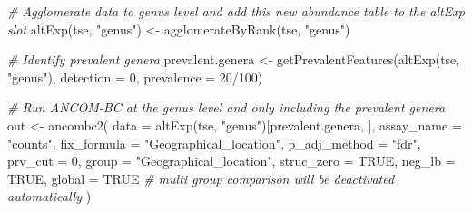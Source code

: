 \documentclass[
]{book}
\newenvironment{Shaded}{\begin{snugshade}}{\end{snugshade}}
\newcommand{\AttributeTok}[1]{\textcolor[rgb]{0.77,0.63,0.00}{#1}}
\newcommand{\CommentTok}[1]{\textcolor[rgb]{0.56,0.35,0.01}{\textit{#1}}}
\newcommand{\ConstantTok}[1]{\textcolor[rgb]{0.00,0.00,0.00}{#1}}
\newcommand{\DecValTok}[1]{\textcolor[rgb]{0.00,0.00,0.81}{#1}}
\newcommand{\FunctionTok}[1]{\textcolor[rgb]{0.00,0.00,0.00}{#1}}
\newcommand{\NormalTok}[1]{#1}
\newcommand{\OtherTok}[1]{\textcolor[rgb]{0.56,0.35,0.01}{#1}}
\newcommand{\SpecialCharTok}[1]{\textcolor[rgb]{0.00,0.00,0.00}{#1}}
\newcommand{\StringTok}[1]{\textcolor[rgb]{0.31,0.60,0.02}{#1}}
\begin{document}
\begin{Shaded}
\begin{Highlighting}[]
\CommentTok{\# Agglomerate data to genus level and add this new abundance table to the altExp slot}
\FunctionTok{altExp}\NormalTok{(tse, }\StringTok{"genus"}\NormalTok{) }\OtherTok{\textless{}{-}} \FunctionTok{agglomerateByRank}\NormalTok{(tse, }\StringTok{"genus"}\NormalTok{)}

\CommentTok{\# Identify prevalent genera}
\NormalTok{prevalent.genera }\OtherTok{\textless{}{-}} \FunctionTok{getPrevalentFeatures}\NormalTok{(}\FunctionTok{altExp}\NormalTok{(tse, }\StringTok{"genus"}\NormalTok{), }\AttributeTok{detection =} \DecValTok{0}\NormalTok{, }\AttributeTok{prevalence =} \DecValTok{20}\SpecialCharTok{/}\DecValTok{100}\NormalTok{)}

\CommentTok{\# Run ANCOM{-}BC at the genus level and only including the prevalent genera}
\NormalTok{out }\OtherTok{\textless{}{-}} \FunctionTok{ancombc2}\NormalTok{(}
  \AttributeTok{data =} \FunctionTok{altExp}\NormalTok{(tse, }\StringTok{"genus"}\NormalTok{)[prevalent.genera, ],}
  \AttributeTok{assay\_name =} \StringTok{"counts"}\NormalTok{, }
  \AttributeTok{fix\_formula =} \StringTok{"Geographical\_location"}\NormalTok{, }
  \AttributeTok{p\_adj\_method =} \StringTok{"fdr"}\NormalTok{, }
  \AttributeTok{prv\_cut =} \DecValTok{0}\NormalTok{,}
  \AttributeTok{group =} \StringTok{"Geographical\_location"}\NormalTok{, }
  \AttributeTok{struc\_zero =} \ConstantTok{TRUE}\NormalTok{, }
  \AttributeTok{neg\_lb =} \ConstantTok{TRUE}\NormalTok{,}
  \AttributeTok{global =} \ConstantTok{TRUE} \CommentTok{\# multi group comparison will be deactivated automatically }
\NormalTok{)}
\end{Highlighting}
\end{Shaded}

\begin{Shaded}
\end{Shaded}
\end{document}
